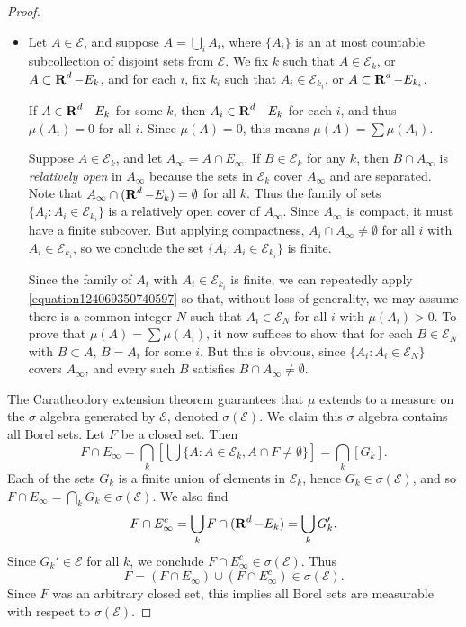 \begin{proof}
\begin{itemize}
		\item Let $A \in \mathcal{E}$, and suppose $A = \bigcup_i A_i$, where $\{ A_i \}$ is an at most countable subcollection of disjoint sets from $\mathcal{E}$. We fix $k$ such that $A \in \mathcal{E}_k$, or $A \subset \operatorname{\mathbf{R}}^d - E_k$, and for each $i$, fix $k_i$ such that $A_i \in \mathcal{E}_{k_i}$, or $A \subset \operatorname{\mathbf{R}}^d - E_{k_i}$.

		If $A \in \operatorname{\mathbf{R}}^d - E_k$ for some $k$, then $A_i \in \operatorname{\mathbf{R}}^d - E_k$ for each $i$, and thus $\mu(A_i) = 0$ for all $i$. Since $\mu(A) = 0$, this means $\mu(A) = \sum \mu(A_i)$.

		Suppose $A \in \mathcal{E}_k$, and let $A_\infty = A \cap E_\infty$. If $B \in \mathcal{E}_k$ for any $k$, then $B \cap A_\infty$ is \emph{relatively open} in $A_\infty$ because the sets in $\mathcal{E}_k$ cover $A_\infty$ and are separated. Note that $A_\infty \cap (\operatorname{\mathbf{R}}^d - E_k) = \emptyset$ for all $k$. Thus the family of sets $\{ A_i : A_i \in \mathcal{E}_{k_i} \}$ is a relatively open cover of $A_\infty$. Since $A_\infty$ is compact, it must have a finite subcover. But applying compactness, $A_i \cap A_\infty \neq \emptyset$ for all $i$ with $A_i \in \mathcal{E}_{k_i}$, so we conclude the set $\{ A_i : A_i \in \mathcal{E}_{k_i} \}$ is finite.

		Since the family of $A_i$ with $A_i \in \mathcal{E}_{k_i}$ is finite, we can repeatedly apply \eqref{equation124069350740597} so that, without loss of generality, we may assume there is a common integer $N$ such that $A_i \in \mathcal{E}_N$ for all $i$ with $\mu(A_i) > 0$. To prove that $\mu(A) = \sum \mu(A_i)$, it now suffices to show that for each $B \in \mathcal{E}_N$ with $B \subset A$, $B = A_i$ for some $i$. But this is obvious, since $\{ A_i : A_i \in \mathcal{E}_N \}$ covers $A_\infty$, and every such $B$ satisfies $B \cap A_\infty \neq \emptyset$.
	\end{itemize}
	The Caratheodory extension theorem guarantees that $\mu$ extends to a measure on the $\sigma$ algebra generated by $\mathcal{E}$, denoted $\sigma(\mathcal{E})$. We claim this $\sigma$ algebra contains all Borel sets. Let $F$ be a closed set. Then
	\[ F \cap E_\infty = \bigcap_k \left[ \bigcup \{ A : A \in \mathcal{E}_k, A \cap F \neq \emptyset \} \right] = \bigcap_k \left[ G_k \right]. \]
	Each of the sets $G_k$ is a finite union of elements in $\mathcal{E}_k$, hence $G_k \in \sigma(\mathcal{E})$, and so $F \cap E_\infty = \bigcap_k G_k \in \sigma(\mathcal{E})$. We also find
	\[ F \cap E_\infty^c = \bigcup_k F \cap (\operatorname{\mathbf{R}}^d - E_k) = \bigcup_k G_k'. \]
	Since $G_k' \in \mathcal{E}$ for all $k$, we conclude $F \cap E_\infty^c \in \sigma(\mathcal{E})$. Thus
	\[ F = (F \cap E_\infty) \cup (F \cap E_\infty^c) \in \sigma(\mathcal{E}). \]
	Since $F$ was an arbitrary closed set, this implies all Borel sets are measurable with respect to $\sigma(\mathcal{E})$.
\end{proof}

